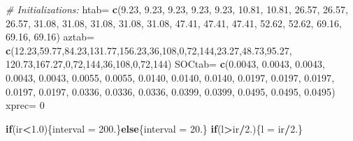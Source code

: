 \documentclass[]{book}
\newenvironment{Shaded}{\begin{snugshade}}{\end{snugshade}}
\newcommand{\KeywordTok}[1]{\textcolor[rgb]{0.13,0.29,0.53}{\textbf{#1}}}
\newcommand{\DecValTok}[1]{\textcolor[rgb]{0.00,0.00,0.81}{#1}}
\newcommand{\FloatTok}[1]{\textcolor[rgb]{0.00,0.00,0.81}{#1}}
\newcommand{\StringTok}[1]{\textcolor[rgb]{0.31,0.60,0.02}{#1}}
\newcommand{\CommentTok}[1]{\textcolor[rgb]{0.56,0.35,0.01}{\textit{#1}}}
\newcommand{\ControlFlowTok}[1]{\textcolor[rgb]{0.13,0.29,0.53}{\textbf{#1}}}
\newcommand{\OperatorTok}[1]{\textcolor[rgb]{0.81,0.36,0.00}{\textbf{#1}}}
\newcommand{\NormalTok}[1]{#1}
\theoremstyle{definition}
\theoremstyle{definition}
\theoremstyle{definition}
\theoremstyle{remark}
\begin{document}
\begin{Shaded}
\begin{Highlighting}[]
\CommentTok{# Initializations:}
\NormalTok{htab=}\StringTok{ }\KeywordTok{c}\NormalTok{(}\FloatTok{9.23}\NormalTok{, }\FloatTok{9.23}\NormalTok{, }\FloatTok{9.23}\NormalTok{, }\FloatTok{9.23}\NormalTok{, }\FloatTok{9.23}\NormalTok{, }\FloatTok{10.81}\NormalTok{, }\FloatTok{10.81}\NormalTok{, }\FloatTok{26.57}\NormalTok{,}
        \FloatTok{26.57}\NormalTok{, }\FloatTok{26.57}\NormalTok{, }\FloatTok{31.08}\NormalTok{, }\FloatTok{31.08}\NormalTok{, }\FloatTok{31.08}\NormalTok{, }\FloatTok{31.08}\NormalTok{, }\FloatTok{31.08}\NormalTok{, }\FloatTok{47.41}\NormalTok{,}
        \FloatTok{47.41}\NormalTok{, }\FloatTok{47.41}\NormalTok{, }\FloatTok{52.62}\NormalTok{, }\FloatTok{52.62}\NormalTok{, }\FloatTok{69.16}\NormalTok{, }\FloatTok{69.16}\NormalTok{, }\FloatTok{69.16}\NormalTok{)}
\NormalTok{aztab=}\StringTok{ }\KeywordTok{c}\NormalTok{(}\FloatTok{12.23}\NormalTok{,}\FloatTok{59.77}\NormalTok{,}\FloatTok{84.23}\NormalTok{,}\FloatTok{131.77}\NormalTok{,}\FloatTok{156.23}\NormalTok{,}\DecValTok{36}\NormalTok{,}\DecValTok{108}\NormalTok{,}\DecValTok{0}\NormalTok{,}\DecValTok{72}\NormalTok{,}\DecValTok{144}\NormalTok{,}\FloatTok{23.27}\NormalTok{,}\FloatTok{48.73}\NormalTok{,}\FloatTok{95.27}\NormalTok{,}
         \FloatTok{120.73}\NormalTok{,}\FloatTok{167.27}\NormalTok{,}\DecValTok{0}\NormalTok{,}\DecValTok{72}\NormalTok{,}\DecValTok{144}\NormalTok{,}\DecValTok{36}\NormalTok{,}\DecValTok{108}\NormalTok{,}\DecValTok{0}\NormalTok{,}\DecValTok{72}\NormalTok{,}\DecValTok{144}\NormalTok{)}
\NormalTok{SOCtab=}\StringTok{ }\KeywordTok{c}\NormalTok{(}\FloatTok{0.0043}\NormalTok{, }\FloatTok{0.0043}\NormalTok{, }\FloatTok{0.0043}\NormalTok{, }\FloatTok{0.0043}\NormalTok{, }\FloatTok{0.0043}\NormalTok{, }\FloatTok{0.0055}\NormalTok{,}
          \FloatTok{0.0055}\NormalTok{, }\FloatTok{0.0140}\NormalTok{, }\FloatTok{0.0140}\NormalTok{, }\FloatTok{0.0140}\NormalTok{, }\FloatTok{0.0197}\NormalTok{, }\FloatTok{0.0197}\NormalTok{,}
          \FloatTok{0.0197}\NormalTok{, }\FloatTok{0.0197}\NormalTok{, }\FloatTok{0.0197}\NormalTok{, }\FloatTok{0.0336}\NormalTok{, }\FloatTok{0.0336}\NormalTok{, }\FloatTok{0.0336}\NormalTok{,}
          \FloatTok{0.0399}\NormalTok{, }\FloatTok{0.0399}\NormalTok{, }\FloatTok{0.0495}\NormalTok{, }\FloatTok{0.0495}\NormalTok{, }\FloatTok{0.0495}\NormalTok{)}
\NormalTok{xprec=}\StringTok{ }\DecValTok{0}

\ControlFlowTok{if}\NormalTok{(ir}\OperatorTok{<}\FloatTok{1.0}\NormalTok{)\{interval =}\StringTok{ }\DecValTok{200}\NormalTok{.\}}\ControlFlowTok{else}\NormalTok{\{interval =}\StringTok{ }\DecValTok{20}\NormalTok{.\}}
\ControlFlowTok{if}\NormalTok{(l}\OperatorTok{>}\NormalTok{ir}\OperatorTok{/}\DecValTok{2}\NormalTok{.)\{l =}\StringTok{ }\NormalTok{ir}\OperatorTok{/}\DecValTok{2}\NormalTok{.\}}


\end{Highlighting}
\end{Shaded}
\end{document}
